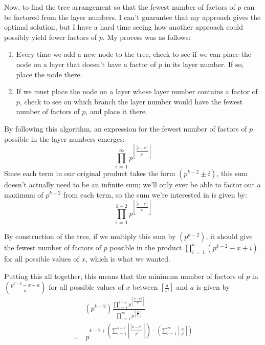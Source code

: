\documentclass[a4paper, 12pt, reqno]{amsart}
\newcommand\ceil[1]{\left\lceil #1 \right\rceil}
\newcommand\floor[1]{\left\lfloor #1 \right\rfloor}
\begin{document}
		Now, to find the tree arrangement so that the fewest number of factors of $p$ can be factored from the layer numbers. I can't guarantee that my approach gives the
		optimal solution, but I have a hard time seeing how another approach could possibly yield fewer factors of $p$. My process was as follows:
		\begin{enumerate}
			\item{Every time we add a new node to the tree, check to see if we can place the node on a layer that doesn't have a factor of $p$ in its layer number. If so, 
			place the node there.}
			\item{If we must place the node on a layer whose layer number contains a factor of $p$, check to see on which branch the layer number would have the fewest number
			of factors of $p$, and place it there.}
		\end{enumerate}
		
		By following this algorithm, an expression for the fewest number of factors of $p$ possible in the layer numbers emerges:
		\[
			\prod_{i\,=\,1}^\infty p^{\floor{\frac{|a-p^i|}{p^i}}}
		\]
		Since each term in our original product takes the form $(p^{k-2} \pm i)$, this sum doesn't actually need to be an infinite sum; we'll only ever be able to factor out a
		maximum of $p^{k-2}$ from each term, so the sum we're interested in is given by:
		\[
			\prod_{i\,=\,1}^{k-2} p^{\floor{\frac{|a-p^i|}{p^i}}}
		\]
		
		By construction of the tree, if we multiply this sum by $(p^{k-2})$, it should give the fewest number of factors of $p$ possible in the product
		$\prod_{i\,=\,1}^a (p^{k-2}-x+i)$ for all possible values of $x$, which is what we wanted.
		
		Putting this all together, this means that the minimum number of factors of $p$ in $\binom{p^{k-2}-x+a}{a}$ for all possible values of $x$ between 
		$\ceil{\frac{a}{\omega}}$ and $a$ is given by
		\begin{align*}
			 & (p^{k-2})\frac{\prod_{i\,=\,1}^{k-2} p^{\floor{\frac{|a-p^i|}{p^i}}}}{\prod_{i\,=\,1}^\infty p^{\floor{\frac{a}{p^i}}}} \\
			=&\, p^{k-2 + \left(\sum_{i\,=\,1}^{k-2} \floor{\frac{|a-p^i|}{p^i}} \right) - \left(\sum_{i\,=\,1}^\infty \floor{\frac{a}{p^i}} \right)}
		\end{align*}
		
\end{document}
